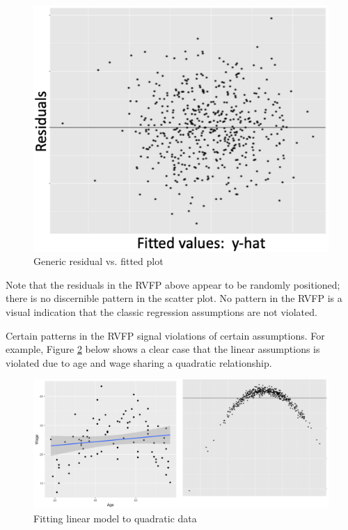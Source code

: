 \documentclass[
]{book}
\begin{document}
\begin{figure}
\includegraphics[width=6.85in]{images/genericrvfp} \caption{Generic residual vs. fitted plot}\label{fig:genericrvfp}
\end{figure}

Note that the residuals in the RVFP above appear to be randomly positioned; there is no discernible pattern in the scatter plot. No pattern in the RVFP is a visual indication that the classic regression assumptions are not violated.

Certain patterns in the RVFP signal violations of certain assumptions. For example, Figure \ref{fig:rvfplinear} below shows a clear case that the linear assumptions is violated due to age and wage sharing a quadratic relationship.

\begin{figure}
\includegraphics[width=14.71in]{images/rvfp_linear} \caption{Fitting linear model to quadratic data}\label{fig:rvfplinear}
\end{figure}
\end{document}
